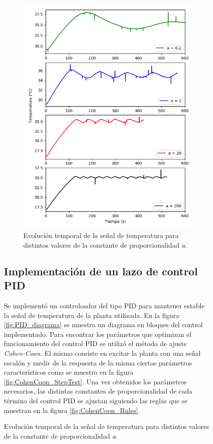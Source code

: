 \documentclass[a4paper,11pt]{article}
\begin{document}
\begin{figure}[!ht]
\begin{figure}[!ht]
\centering
\includegraphics[width=\textwidth]{figs/lazo_temp}
\caption{Evolución temporal de la señal de temperatura para distintos
valores de la constante de proporcionalidad \emph{a}.}
\label{fig:lazo_temp}
\end{figure}

\clearpage
\subsection{Implementación de un lazo de control PID}

Se implementó un controloador del tipo PID para mantener estable la
señal de temperatura de la planta utilizada. En la figura
\ref{fig:PID_diagrama} se muestra un diagrama en bloques del control
implementado.  Para encontrar los parámetros que optimizan el
funcionamiento del control PID se utilizó el método de ajuste
\emph{Cohen-Coon}. El mismo consiste en excitar la planta con una señal
escalón y medir de la respuesta de la misma ciertos parámetros
característicos como se muestra en la figura
\ref{fig:CohenCoon_StepTest}. Una vez obtenidos los parámetros
necesarios, las distintas constantes de proporcionalidad de cada término
del control PID se ajustan siguiendo las reglas que se muestran en la
figura \ref{fig:CohenCoon_Rules}.


\end{figure}
\end{document}
